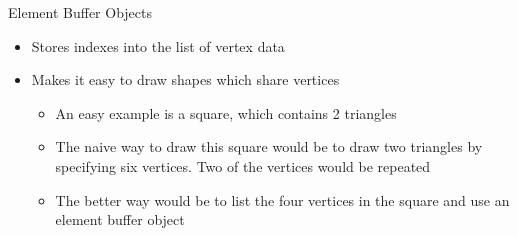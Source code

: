 \documentclass{beamer}
\begin{document}
\begin{frame}[fragile]{Element Buffer Objects}
    \begin{itemize}
        \item Stores indexes into the list of vertex data
        \item Makes it easy to draw shapes which share vertices
        \begin{itemize}
            \item An easy example is a square, which contains 2 triangles
            \item The naive way to draw this square would be to draw two triangles by specifying six vertices. Two of
                the vertices would be repeated
            \item The better way would be to list the four vertices in the square and use an element buffer object
        \end{itemize}
    \end{itemize}
\end{frame}
\end{document}
